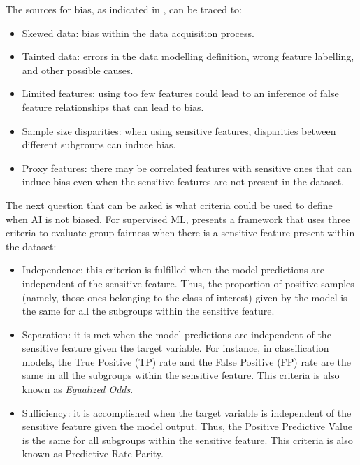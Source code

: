 \documentclass[final]{elsarticle}
\begin{document}
The sources for bias, as indicated in \cite{barocas2016big}, can be traced to:
\begin{itemize}[leftmargin=*]
\item Skewed data: bias within the data acquisition process.

\item Tainted data: errors in the data modelling definition, wrong feature labelling, and other possible causes.

\item Limited features: using too few features could lead to an inference of false feature relationships that can lead to bias.

\item Sample size disparities: when using sensitive features, disparities between different subgroups can induce bias.

\item Proxy features: there may be correlated features with sensitive ones that can induce bias even when the sensitive features are not present in the dataset.
\end{itemize}

The next question that can be asked is what criteria could be used to define when AI is not biased. For supervised ML, \cite{hardt2016equality} presents a framework that uses three criteria to evaluate group fairness when there is a sensitive feature present within the dataset:
\begin{itemize}[leftmargin=*]
\item Independence: this criterion is fulfilled when the model predictions are independent of the sensitive feature. Thus, the proportion of positive samples (namely, those ones belonging to the class of interest) given by the model is the same for all the subgroups within the sensitive feature.

\item Separation: it is met when the model predictions are independent of the sensitive feature given the target variable. For instance, in classification models, the True Positive (TP) rate and the False Positive (FP) rate are the same in all the subgroups within the sensitive feature. This criteria is also known as \emph{Equalized Odds}.

\item Sufficiency: it is accomplished when the target variable is independent of the sensitive feature given the model output. Thus, the Positive Predictive Value is the same for all subgroups within the sensitive feature. This criteria is also known as Predictive Rate Parity.
\end{itemize}
\end{document}
